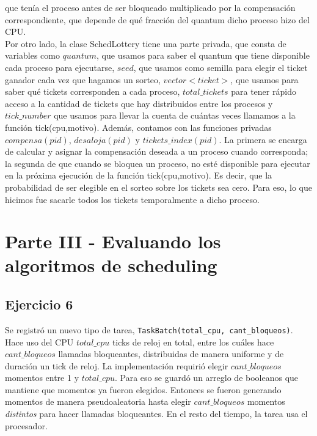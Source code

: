 \documentclass[a4paper]{article}
\begin{document}
que ten\'ia el proceso antes de ser bloqueado multiplicado por la compensaci\'on correspondiente, que 
depende de qu\'e fracci\'on del quantum dicho proceso hizo del CPU. \\
Por otro lado, la clase SchedLottery tiene una parte privada, que consta de variables como $quantum$, 
que usamos para saber el quantum que tiene disponible cada proceso para ejecutarse, $seed$, que
usamos como semilla para elegir el ticket ganador cada vez que hagamos un sorteo, $vector<ticket>$, que
usamos para saber qu\'e tickets corresponden a cada proceso, $total\_tickets$ para tener r\'apido acceso
a la cantidad de tickets que hay distribuidos entre los procesos y $tick\_number$ que usamos para 
llevar la cuenta de cu\'antas veces llamamos a la funci\'on tick(cpu,motivo). Adem\'as, contamos con 
las funciones privadas $compensa(pid)$, $desaloja(pid)$ y $tickets\_index(pid)$. La primera se encarga de
calcular y asignar la compensaci\'on deseada a un proceso cuando corresponda; la segunda de que cuando
se bloquea un proceso, no est\'e disponible para ejecutar en la pr\'oxima ejecuci\'on de la funci\'on
tick(cpu,motivo). Es decir, que la probabilidad de ser elegible en el sorteo sobre los tickets sea cero.
Para eso, lo que hicimos fue sacarle todos los tickets temporalmente a dicho proceso. \\ 

\newpage
{}
\section{Parte III - Evaluando los algoritmos de scheduling}

\subsection{Ejercicio 6}

Se registró un nuevo tipo de tarea, \texttt{TaskBatch(total\_cpu, cant\_bloqueos)}. Hace uso del CPU $total\_cpu$ ticks de reloj en total, entre los cuáles hace $cant\_bloqueos$ llamadas bloqueantes, distribuidas de manera uniforme y de duración un tick de reloj.
La implementación requirió elegir $cant\_bloqueos$ momentos entre 1 y $total\_cpu$. Para eso se guardó un arreglo de booleanos que mantiene que momentos ya fueron elegidos. Entonces se fueron generando momentos de manera pseudo\-aleatoria hasta elegir $cant\_bloqueos$ momentos \textit{distintos} para hacer llamadas bloqueantes. En el resto del tiempo, la tarea usa el procesador.
\end{document}
